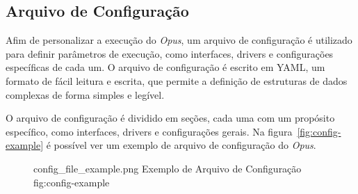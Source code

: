 \subsection{Arquivo de Configuração}
\label{sec:arquivo-configuracao}

Afim de personalizar a execução do \emph{Opus}, um arquivo de configuração é utilizado para definir parâmetros de execução, como
interfaces, drivers e configurações específicas de cada um. O arquivo de configuração é escrito em YAML, um formato de fácil leitura
e escrita, que permite a definição de estruturas de dados complexas de forma simples e legível.

O arquivo de configuração é dividido em seções, cada uma com um propósito específico, como interfaces, drivers e configurações gerais.
Na figura~\ref{fig:config-example} é possível ver um exemplo de arquivo de configuração do \emph{Opus}.

\begin{figure}[H]
    {config_file_example.png}
    {Exemplo de Arquivo de Configuração}
    {fig:config-example}
\end{figure}